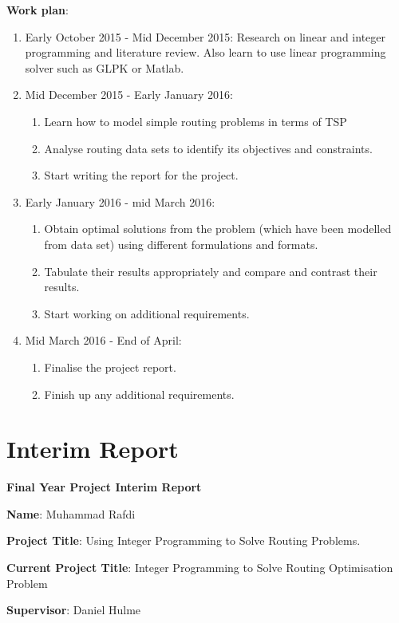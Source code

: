 \textbf{Work plan}:
\begin{enumerate}
    \item Early October 2015 - Mid December 2015: Research on linear and integer programming and literature review. Also learn to use linear programming solver such as GLPK or Matlab.
    \item Mid December 2015 - Early January 2016:
    \begin{enumerate}
        \item Learn how to model simple routing problems in terms of TSP
        \item Analyse routing data sets to identify its objectives and constraints.
        \item Start writing the report for the project.
    \end{enumerate}
     \item Early January 2016 - mid March 2016:
     \begin{enumerate}
        \item Obtain optimal solutions from the problem (which have been modelled from data set) using different formulations and formats.
        \item Tabulate their results appropriately and compare and contrast their results.
        \item Start working on additional requirements.
    \end{enumerate}
    \item Mid March 2016 - End of April:
    \begin {enumerate}
        \item Finalise the project report.
        \item Finish up any additional requirements.
    \end{enumerate}
\end{enumerate}

\section{Interim Report}

\textbf{Final Year Project Interim Report}

\textbf{Name}: Muhammad Rafdi

\textbf{Project Title}: Using Integer Programming to Solve Routing Problems.

\textbf{Current Project Title}: Integer Programming to Solve Routing Optimisation
Problem

\textbf{Supervisor}: Daniel Hulme


